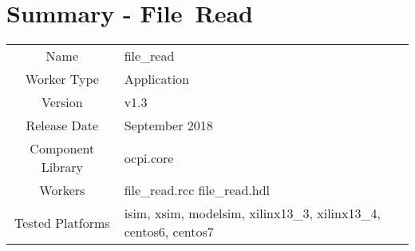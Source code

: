 \documentclass{article}
\author{} %
\date{Version \docVersion} %
\title{\docTitle}
\def\docVersion{1.3}
\def\comp{file\_read}
\def\Comp{File\ Read }
\begin{document}
\section*{Summary - \Comp}
\begin{tabular}{|c|M{13.5cm}|}
	\hline
	                  &                                                                                \\
	\hline
	Name              & \comp                                                                          \\
	\hline
	Worker Type       & Application                                                                    \\
	\hline
	Version           &  v\docVersion \\
	\hline
	Release Date      &  September 2018 \\
	\hline
	Component Library &   ocpi.core\\
	\hline
	Workers           &  file\_read.rcc file\_read.hdl\\
	\hline
	Tested Platforms  &  isim, xsim, modelsim, xilinx13\_3, xilinx13\_4, centos6, centos7\\
	\hline
\end{tabular}
\end{document}
